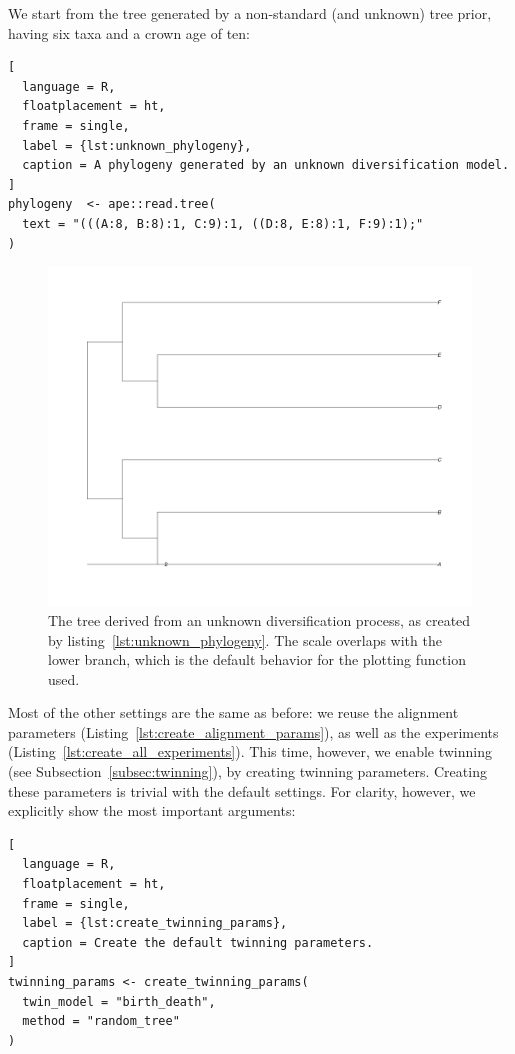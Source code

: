 We start from the tree generated by a non-standard (and unknown) tree prior, 
having six taxa and a crown age of ten:
\begin{lstlisting}[
  language = R, 
  floatplacement = ht,
  frame = single, 
  label = {lst:unknown_phylogeny},
  caption = A phylogeny generated by an unknown diversification model.
]
phylogeny  <- ape::read.tree(
  text = "(((A:8, B:8):1, C:9):1, ((D:8, E:8):1, F:9):1);"
)
\end{lstlisting}
\begin{figure}[H]
  \includegraphics[width=\textwidth]{example_3/true_tree.png}
  \caption{The tree derived from an unknown diversification process, 
    as created by listing~\ref{lst:unknown_phylogeny}.
    The scale overlaps with the lower branch, which is the default 
    behavior for the plotting function used.
  }
\end{figure}

Most of the other settings are the same as before: 
we reuse the alignment parameters (Listing~\ref{lst:create_alignment_params}), 
as well as the experiments (Listing~\ref{lst:create_all_experiments}).
This time, however, we enable twinning (see Subsection~\ref{subsec:twinning}),
by creating twinning parameters.
Creating these parameters is trivial with the default settings.
For clarity, however, we explicitly show the most important arguments:

\begin{lstlisting}[
  language = R,
  floatplacement = ht,
  frame = single,
  label = {lst:create_twinning_params},
  caption = Create the default twinning parameters.
]
twinning_params <- create_twinning_params(
  twin_model = "birth_death",
  method = "random_tree"
)
\end{lstlisting}

